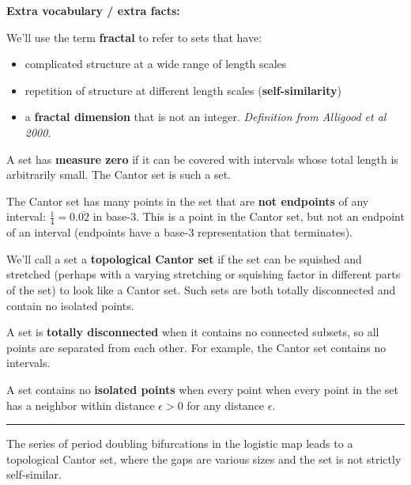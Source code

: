 \documentclass[12pt,letterpaper,noanswers]{exam}
\begin{document}
\noindent \textbf{Extra vocabulary / extra facts:}
\begin{tcolorbox}


We'll use the term \textbf{fractal} to refer to sets that have:
\begin{itemize}
\itemsep0em
    \item complicated structure at a wide range of length scales
    \item repetition of structure at different length scales (\textbf{self-similarity})
    \item a \textbf{fractal dimension} that is not an integer.  \emph{Definition from Alligood et al 2000}.
\end{itemize}


A set has \textbf{measure zero} if it can be covered with intervals whose total length is arbitrarily small.  The Cantor set is such a set.

The Cantor set has many points in the set that are \textbf{not endpoints} of any interval: $\frac{1}{4} =0.\overline{02}$ in base-$3$.  This is a point in the Cantor set, but not an endpoint of an interval (endpoints have a base-$3$ representation that terminates).

We'll call a set a \textbf{topological Cantor set} if the set can be squished and stretched (perhaps with a varying stretching or squishing factor in different parts of the set) to look like a Cantor set.  Such sets are both totally disconnected and contain no isolated points.

A set is \textbf{totally disconnected} when it contains no connected subsets, so all points are separated from each other.  For example, the Cantor set contains no intervals.

A set contains no \textbf{isolated points} when every point when every point in the set has a neighbor within distance $\epsilon>0$ for any distance $\epsilon$.

\end{tcolorbox}

\vspace{0.2cm}
\hrule
\vspace{0.2cm}

The series of period doubling bifurcations in the logistic map leads to a topological Cantor set, where the gaps are various sizes and the set is not strictly self-similar.
\end{document}
